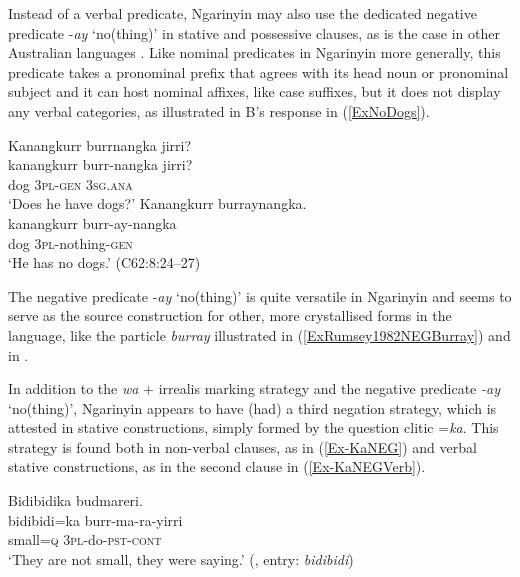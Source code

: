 \documentclass[output=paper,colorlinks,citecolor=brown]{langscibook}
\begin{document}
Instead of a verbal predicate, Ngarinyin may also use the dedicated negative predicate -\textit{ay} `no(thing)' in stative and possessive clauses, as is the case in other Australian languages \citep[135]{Veselinova2013neg.exist}. Like nominal predicates in Ngarinyin more generally, this predicate takes a pronominal prefix that agrees with its head noun or pronominal subject and it can host nominal affixes, like case suffixes, but it does not display any verbal categories, as illustrated in B's response in (\ref{ExNoDogs}).

\begin{exe}
\ex \label{ExNoDogs}
\begin{xlist}
 \glll Kanangkurr burrnangka jirri?\\
kanangkurr burr-nangka jirri?\\
dog 3\textsc{pl}-\textsc{gen} 3\textsc{sg}.\textsc{ana}\\
\trans `Does he have dogs?'
 \glll Kanangkurr burraynangka.\\
kanangkurr burr-ay-nangka\\
dog 3\textsc{pl}-nothing-\textsc{gen}\\
\trans `He has no dogs.' (C62:8:24--27)
\end{xlist}
\end{exe}

The negative predicate -\textit{ay} `no(thing)' is quite versatile in Ngarinyin and seems to serve as the source construction for other, more crystallised forms in the language, like the particle \textit{burray} illustrated in (\ref{ExRumsey1982NEGBurray}) and in .

In addition to the \textit{wa} + irrealis marking strategy and the negative predicate \textit{-ay} `no(thing)', Ngarinyin appears to have (had) a third negation strategy, which is attested in stative constructions, simply formed by the question clitic =\textit{ka}. This strategy is found both in non-verbal clauses, as in (\ref{Ex-KaNEG}) and verbal stative constructions, as in the second clause in (\ref{Ex-KaNEGVerb}).

\begin{exe}
\ex \label{Ex-KaNEG}
\glll Bidibidika budmareri.\\
bidibidi=ka burr-ma-ra-yirri\\
small=\textsc{q} 3\textsc{pl}-do-\textsc{pst}-\textsc{cont}\\
\trans `They are not small, they were saying.' (\citealp{CoatElkin1974}, entry: \textit{bidibidi})
\end{exe}
\end{document}
